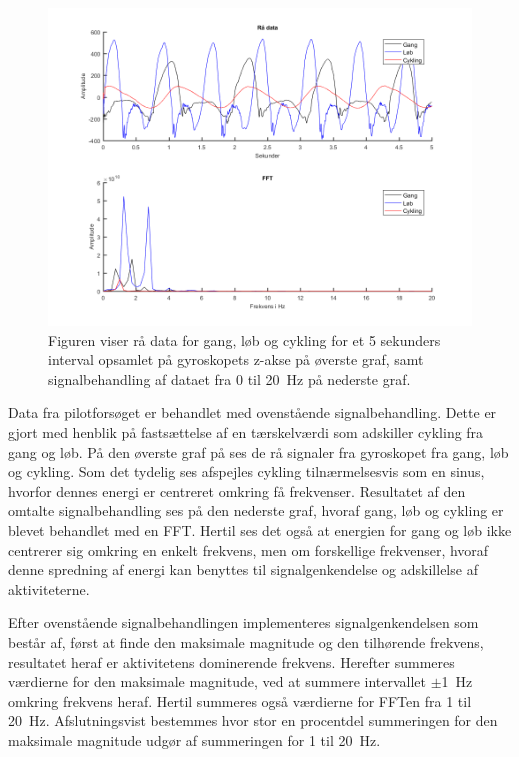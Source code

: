 \begin{figure}[H]
	\centering
	\includegraphics[scale=0.8]{figures/cDesign/gyro_behandling.png}
	\caption{Figuren viser rå data for gang, løb og cykling for et 5 sekunders interval opsamlet på gyroskopets z-akse på øverste graf, samt signalbehandling af dataet fra 0 til 20~Hz på nederste graf.}
	\label{fig:gyro_behandling}
\end{figure}\vspace{-0.5cm}
Data fra pilotforsøget er behandlet med ovenstående signalbehandling. Dette er gjort med henblik på fastsættelse af en tærskelværdi som adskiller cykling fra gang og løb. På den øverste graf på  ses de rå signaler fra gyroskopet fra gang, løb og cykling. Som det tydelig ses afspejles cykling tilnærmelsesvis som en sinus, hvorfor dennes energi er centreret omkring få frekvenser. Resultatet af den omtalte signalbehandling ses på den nederste graf, hvoraf gang, løb og cykling er blevet behandlet med en FFT. Hertil ses det også at energien for gang og løb ikke centrerer sig omkring en enkelt frekvens, men om forskellige frekvenser, hvoraf denne spredning af energi kan benyttes til signalgenkendelse og adskillelse af aktiviteterne. 

Efter ovenstående signalbehandlingen implementeres signalgenkendelsen som består af, først at finde den maksimale magnitude og den tilhørende frekvens, resultatet heraf er aktivitetens dominerende frekvens. Herefter summeres værdierne for den maksimale magnitude, ved at summere intervallet $\pm$1~Hz omkring frekvens heraf. Hertil summeres også værdierne for FFTen fra 1 til 20~Hz. Afslutningsvist bestemmes hvor stor en procentdel summeringen for den maksimale magnitude udgør af summeringen for 1 til 20~Hz.\\ 

